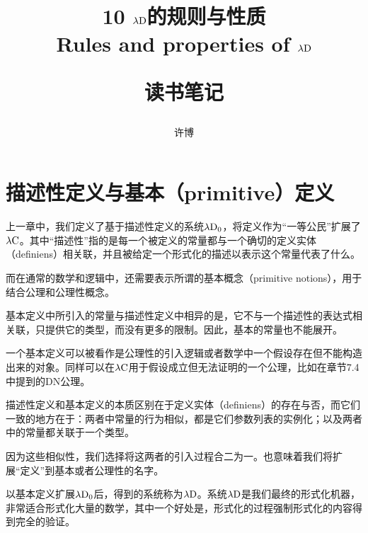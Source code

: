 \documentclass[UTF8]{article}
\title{10 $\lambda{\rm D}$的规则与性质\\Rules and properties of $\lambda{\rm D}$\\[2ex]\begin{large}读书笔记\end{large}}
\author{许博}
\date{}
\begin{document}
\maketitle
	\section{描述性定义与基本（primitive）定义}
	\noindent
	上一章中，我们定义了基于描述性定义的系统$\lambda{\rm D_0}$，将定义作为“一等公民”扩展了$\lambda{\rm C}$。其中“描述性”指的是每一个被定义的常量都与一个确切的定义实体（definiens）相关联，并且被给定一个形式化的描述以表示这个常量代表了什么。
	
		而在通常的数学和逻辑中，还需要表示所谓的基本概念（primitive  notions），用于结合公理和公理性概念。
		
		基本定义中所引入的常量与描述性定义中相异的是，它不与一个描述性的表达式相关联，只提供它的类型，而没有更多的限制。因此，基本的常量也不能展开。
		
		一个基本定义可以被看作是公理性的引入逻辑或者数学中一个假设存在但不能构造出来的对象。同样可以在$\lambda{\rm C}$用于假设成立但无法证明的一个公理，比如在章节7.4中提到的DN公理。
		
		描述性定义和基本定义的本质区别在于定义实体（definiens）的存在与否，而它们一致的地方在于：两者中常量的行为相似，都是它们参数列表的实例化；以及两者中的常量都关联于一个类型。
		
		因为这些相似性，我们选择将这两者的引入过程合二为一。也意味着我们将扩展“定义”到基本或者公理性的名字。
		
		以基本定义扩展$\lambda{\rm D_0}$后，得到的系统称为$\lambda{\rm D}$。系统$\lambda{\rm D}$是我们最终的形式化机器，非常适合形式化大量的数学，其中一个好处是，形式化的过程强制形式化的内容得到完全的验证。
\end{document}
